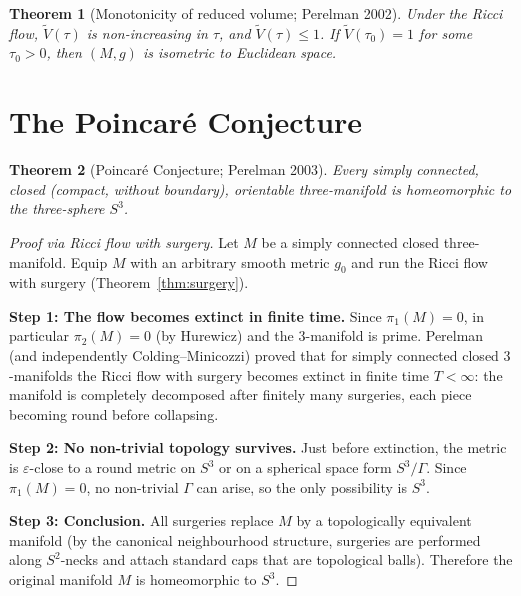 \documentclass[12pt,a4paper]{amsart}
\newtheorem{theorem}{Theorem}[section]
\theoremstyle{definition}
\theoremstyle{remark}
\begin{document}
\begin{theorem}[Monotonicity of reduced volume; Perelman 2002]
Under the Ricci flow, $\tilde V(\tau)$ is non-increasing in $\tau$, and
$\tilde V(\tau) \leq 1$.  If $\tilde V(\tau_0) = 1$ for some $\tau_0 > 0$,
then $(M,g)$ is isometric to Euclidean space.
\end{theorem}


\section{The Poincar\'{e} Conjecture}
\label{sec:poincare}

\begin{theorem}[Poincar\'{e} Conjecture; Perelman 2003]
\label{thm:poincare}
Every simply connected, closed (compact, without boundary), orientable
three-manifold is homeomorphic to the three-sphere $S^3$.
\end{theorem}

\begin{proof}[Proof via Ricci flow with surgery]
Let $M$ be a simply connected closed three-manifold.  Equip $M$ with an
arbitrary smooth metric $g_0$ and run the Ricci flow with surgery
(Theorem~\ref{thm:surgery}).

\medskip
\textbf{Step 1: The flow becomes extinct in finite time.}
Since $\pi_1(M) = 0$, in particular $\pi_2(M) = 0$ (by Hurewicz) and the
$3$-manifold is prime.  Perelman~\cite{Perelman2003b} (and independently
Colding--Minicozzi) proved that for simply connected closed $3$-manifolds
the Ricci flow with surgery becomes extinct in finite time $T < \infty$:
the manifold is completely decomposed after finitely many surgeries, each
piece becoming round before collapsing.

\medskip
\textbf{Step 2: No non-trivial topology survives.}
Just before extinction, the metric is $\varepsilon$-close to a round metric
on $S^3$ or on a spherical space form $S^3/\Gamma$.  Since $\pi_1(M) = 0$,
no non-trivial $\Gamma$ can arise, so the only possibility is $S^3$.

\medskip
\textbf{Step 3: Conclusion.}
All surgeries replace $M$ by a topologically equivalent manifold (by the
canonical neighbourhood structure, surgeries are performed along $S^2$-necks
and attach standard caps that are topological balls).  Therefore the original
manifold $M$ is homeomorphic to $S^3$.
\end{proof}
\end{document}
